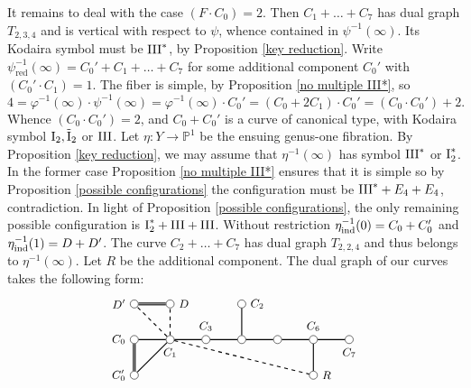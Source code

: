 \documentclass[oneside, 12pt]{amsart}
\theoremstyle{definition}
\theoremstyle{remark}
\newcommand{\PP}{\mathbb{P}}
\newcommand{\I}{\text{\rm I}}
\newcommand{\III}{\text{\rm III}}
\newcommand{\tI}{\text{\rm \~{I}}}
\newcommand{\ra}{\rightarrow}
\newcommand{\red}{{\operatorname{red}}}
\newcommand{\ind}{\text{\rm ind}}
\newcommand{\inv}{{-1}}
\begin{document}
It remains to deal with the case $(F\cdot C_0)=2$. Then $C_1+\ldots+C_7$ has dual graph $T_{2,3,4}$ and is vertical with respect to $\psi$,
whence contained in $\psi^\inv(\infty)$. Its Kodaira symbol must be $\III^*$, by Proposition \ref{key reduction}.
Write $\psi^\inv_\red(\infty)=C_0'+C_1+\ldots+C_7$ for some additional component $C_0'$ with $(C_0'\cdot C_1)=1$.
The fiber is simple, by Proposition \ref{no multiple III*}, so
$$
4=\varphi^\inv(\infty)\cdot \psi^\inv(\infty) = \varphi^\inv(\infty)\cdot C_0' = (C_0+ 2C_1)\cdot C_0' = (C_0\cdot C_0') +2.
$$
Whence $(C_0\cdot C_0')=2$, and $C_0+C_0'$ is a curve of canonical type, with Kodaira symbol $\I_2,\tI_2$ or $\III$. 
Let $\eta:Y\ra\PP^1$ be the
ensuing genus-one fibration. By Proposition \ref{key reduction}, we may assume that $\eta^{-1}(\infty)$ has 
symbol $\III^*$ or $\I_2^*$. In the former case Proposition \ref{no multiple III*} ensures that it is simple
so by  Proposition \ref{possible configurations} the configuration must be $\III^*+E_4+E_4$, contradiction.
In light of Proposition \ref{possible configurations}, the only remaining possible configuration is $\I_2^*+\III+\III$.
Without restriction $\eta_\ind^{-1}(0)=C_0+C_0'$ and $\eta_\ind^{-1}(1)=D+D'$. 
The curve  $C_2+\ldots+C_7$ has dual graph $T_{2,2,4}$ and thus belongs to $\eta^{-1}(\infty)$.
Let $R$ be the additional component.  The dual graph  of  our curves takes the following form:
\begin{equation*}
\begin{gathered}
\begin{tikzpicture}
[node distance=1cm, font=\small]
\tikzstyle{vertex}=[circle, draw, fill=white, inner sep=0mm, minimum size=1.5ex]
\node[vertex]	(C0)  	at (1,0)  [		label=left:{$C_0$}] {};
\node[vertex]	(C1)	[right of=C0,	label=below:{$C_1$}] {};
\node[vertex]	(C3)	[right of=C1,	label=above:{$C_3$}] {};
\node[vertex]	(C4)	[right of=C3,	label=below:{}] {};
\node[vertex]	(C5)	[right of=C4,	label=below:{}] {};
\node[vertex]	(C6)	[right of=C5,	label=above:{$C_6$}] {};
\node[vertex]	(C7)	[right of=C6,	label=below:{$C_7$}] {};
\node[vertex]	(C2)	[above of=C4,	label=right:{$C_2$}] {};

\node[vertex]	(R)		[below of=C6, 	label=right:{$R$}] {};
\node[vertex]	(C0')	[below of=C0, 	label=left:{$C_0'$}] {};
\node[vertex]	(D)		[above of=C1, 	label=right:{$D$}] {};
\node[vertex]	(D')	[above of=C0, 	label=left:{$D'$}] {};

\draw[thick]    (C0)--(C1)--(C3)--(C4)-- (C5)--(C6)--(C7);
\draw[thick]    (C2)--(C4);
\draw[thick]    (R)--(C6);
\draw[thick,double]  (D)--(D');
\draw[thick,double]  (C0)--(C0');
\draw[thick]  (C1)--(C0');
\draw[thick,dashed]  (C1)--(D);
\draw[thick,dashed]  (C1)--(D');
\draw[thick,dashed]  (C1)--(R);
\end{tikzpicture}
\end{gathered}
\end{equation*}
\end{document}
